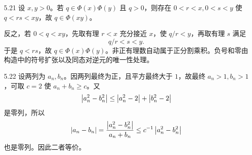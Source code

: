 \begin{solution}{5.21}
设 \(x,y>0\)。若 \(q\in\Phi(x)\Phi(y)\) 且 \(q>0\)，则存在 \(0<r<x,0<s<y\) 使 \(q<rs<xy\)，故 \(q\in\Phi(xy)\)。

反之，若 \(0<q<xy\)，先取有理 \(r<x\) 充分接近 \(x\)，使 \(q/r<y\)，再取有理 \(s\) 满足
\[
 q/r<s<y.
\]
于是 \(q<rs\)，故 \(q\in\Phi(x)\Phi(y)\)。非正有理数自动属于正分割乘积。负号和零由构造中的符号扩张以及同态对逆元的唯一性处理。
\end{solution}

\begin{solution}{5.22}
设两列为 \(a_n,b_n\)。因两列最终为正，且平方最终大于 \(1\)，故最终 \(a_n>1,b_n>1\)，可取 \(c=2\) 使 \(a_n+b_n\ge c\)。又
\[
 \left|a_n^2-b_n^2\right|
 \le\left|a_n^2-2\right|+\left|b_n^2-2\right|
\]
是零列，所以
\[
 \left|a_n-b_n\right|
 =\frac{\left|a_n^2-b_n^2\right|}{a_n+b_n}
 \le c^{-1}\left|a_n^2-b_n^2\right|
\]
也是零列。因此二者等价。
\end{solution}


